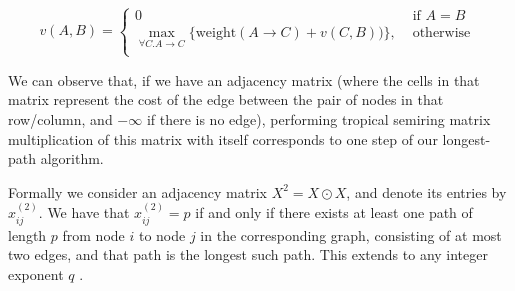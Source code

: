 $$
v(A,B) = 
\begin{cases}
0 &\text{ if } A = B \\
\max_{\forall C . A \to C} \{\mathrm{weight}(A \to C) + v(C,B))\}, &\text{ otherwise } \\
\end{cases}
$$

We can observe that, if we have an adjacency matrix (where the cells in that matrix represent the cost of the edge
between the pair of nodes in that row/column, and $-\infty$ if there is no edge), performing tropical semiring 
matrix multiplication of this matrix with itself corresponds to one step of our longest-path algorithm.

Formally we consider an adjacency matrix $X^{2} = X \odot X$, and denote its entries by $x_{ij}^{(2)}$. We have that $x_{ij}^{(2)} = p$
if and only if there exists at least one path of length $p$ from node $i$ to node $j$ in the corresponding graph,
consisting of at most two edges, and that path is the longest such path. This extends to any integer exponent $q$
\cite{krivulin2012maxplusalgebraapproachmodelling}.


